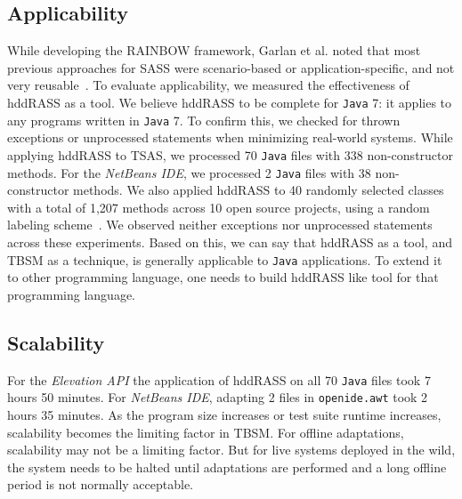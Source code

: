 \subsection{Applicability}
While developing the RAINBOW framework, Garlan et al. noted that most previous approaches for SASS were scenario-based or application-specific, and not very reusable~\cite{garlan2004rainbow}. To evaluate applicability, we measured the effectiveness of hddRASS as a tool. We believe hddRASS to be complete for \texttt{Java} 7: it applies to any programs written in \texttt{Java} 7. To confirm this, we checked for thrown exceptions or unprocessed statements when minimizing real-world systems. While applying hddRASS to TSAS, we processed 70 \texttt{Java} files with 338 non-constructor methods. For the \textit{NetBeans IDE}, we processed 2 \texttt{Java} files with 38 non-constructor methods. We also applied hddRASS to 40 randomly selected classes with a total of 1,207 methods across 10 open source projects, using a random labeling scheme~\cite{christi2018qrs}. We observed neither exceptions nor unprocessed statements across these experiments. Based on this, we can say that hddRASS as a tool, and TBSM as a technique, is generally applicable to \texttt{Java} applications. To extend it to other programming language, one needs to build hddRASS like tool for that programming language.    

\subsection{Scalability}
For the \textit{Elevation API} the application of hddRASS on all 70 \texttt{Java} files took 7 hours 50 minutes. For \textit{NetBeans IDE}, adapting 2 files in \texttt{openide.awt} took 2 hours 35 minutes. As the program size increases or test suite runtime increases, scalability becomes the limiting factor in TBSM. For offline adaptations, scalability may not be a limiting factor. But for live systems deployed in the wild, the system needs to be halted until adaptations are performed and a long offline period is not normally acceptable.

